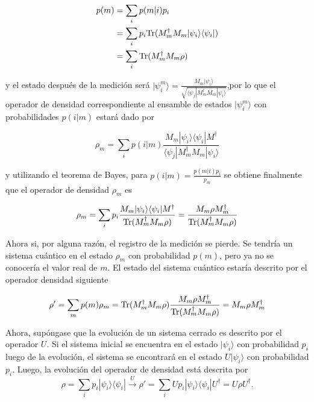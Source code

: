 \begin{equation}
	\label{probabilidad_m}
	\begin{split}
	p(m) &= \sum_{i}p(m|i)p_i\\
	&=\sum_i p_i{\rm Tr}(M_m^{\dagger} M_m |\psi_i\rangle \langle\psi_i|)\\
	&=\sum_{i}{\rm Tr}(M_m^{\dagger} M_m \rho)
	\end{split}
\end{equation}
	


y el estado después de la medición será $|\psi_i^m\rangle=\frac{M_m|\psi_i\rangle}{\sqrt{\langle\psi_j|M_m^{\dagger}M_m|\psi_i\rangle}}$,por lo que el operador de densidad correspondiente al ensamble de estados $|\psi_i^m\rangle$ con probabilidades $p(i|m)$ estará dado por

\[\rho_m=\sum_i p(i|m)\frac{M_m|\psi_i\rangle \langle \psi_i|M^{\dagger}}{\langle\psi_j|M_m^{\dagger}M_m|\psi_i\rangle}\]

y  utilizando el teorema de Bayes, para $p(i|m)=\frac{p(m|i)p_i}{p_m}$ se obtiene finalmente que el operador de densidad $\rho_m$ es{\cite{nielsen_chuang_2010}}

\begin{equation}
	\rho_m=\sum_i p_i \dfrac{M_m|\psi_i\rangle \langle \psi_i|M^{\dagger}}{{\rm Tr}(M^{\dagger}_m M_m \rho )}=\dfrac{M_m \rho M_m^{\dagger}}{{\rm Tr} (M^{\dagger}_m M_m\rho )}
\end{equation}


Ahora si, por alguna razón, el registro de la medición se pierde. Se tendría un sistema cuántico en el estado $\rho_m$ con probabilidad $p(m)$, pero ya no se conocería el valor real de $m$. El estado del sistema cuántico estaría descrito por el operador densidad siguiente

\begin{equation}
	\rho'=\sum_m p(m)\rho_m={\rm Tr}(M^{\dagger}_m M_m\rho )\dfrac{M_m\rho M_m^{\dagger}}{{\rm Tr} (M^{\dagger}_m M_m \rho )}=M_m\rho M_m^{\dagger}
\end{equation}


 
 Ahora, supóngase que la evolución de un sistema cerrado es descrito por el operador $U$. Si el sistema inicial se encuentra en el estado $|\psi_i\rangle$ con probabilidad $p_i$ luego de la evolución, el sistema se encontrará en el estado $U|\psi_i\rangle$ con probabilidad $p_i$. Luego, la evolución del operador de densidad está descrita por {\cite{nielsen_chuang_2010}} \[\rho=\sum_{i}p_i|\psi_i\rangle \langle \psi_i|\xrightarrow{U}\rho'=\sum_{i}Up_i|\psi_i\rangle \langle \psi_i|U^{\dagger}=U\rho U^{\dagger}.\]


